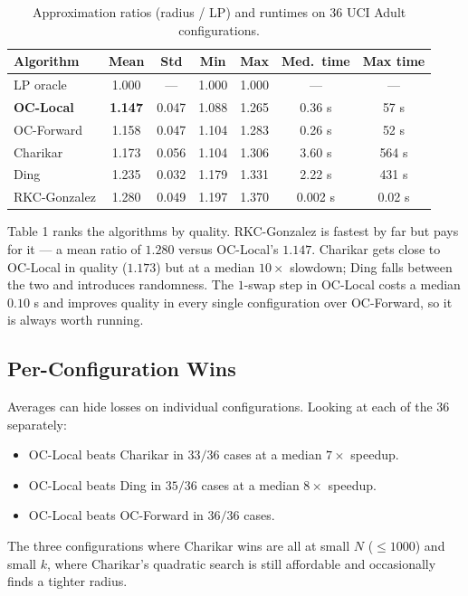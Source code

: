 \documentclass[11pt]{article}
\begin{document}
\begin{table}[H]
\centering
\begin{tabular}{lcccccc}
\toprule
Algorithm & Mean & Std & Min & Max & Med.\ time & Max time \\
\midrule
LP oracle     & 1.000 & ---   & 1.000 & 1.000 & --- & --- \\
\textbf{OC-Local}  & \textbf{1.147} & 0.047 & 1.088 & 1.265 & 0.36 s & 57 s \\
OC-Forward    & 1.158 & 0.047 & 1.104 & 1.283 & 0.26 s & 52 s \\
Charikar      & 1.173 & 0.056 & 1.104 & 1.306 & 3.60 s & 564 s \\
Ding          & 1.235 & 0.032 & 1.179 & 1.331 & 2.22 s & 431 s \\
RKC-Gonzalez  & 1.280 & 0.049 & 1.197 & 1.370 & 0.002 s & 0.02 s \\
\bottomrule
\end{tabular}
\caption{Approximation ratios (radius / LP) and runtimes on 36 UCI Adult configurations.}
\end{table}

Table 1 ranks the algorithms by quality. RKC-Gonzalez is fastest by far but pays for it --- a mean ratio of $1.280$ versus OC-Local's $1.147$. Charikar gets close to OC-Local in quality ($1.173$) but at a median $10\times$ slowdown; Ding falls between the two and introduces randomness. The $1$-swap step in OC-Local costs a median $0.10$ s and improves quality in every single configuration over OC-Forward, so it is always worth running.

\subsection{Per-Configuration Wins}

Averages can hide losses on individual configurations. Looking at each of the 36 separately:
\begin{itemize}
    \item OC-Local beats Charikar in $33/36$ cases at a median $7\times$ speedup.
    \item OC-Local beats Ding in $35/36$ cases at a median $8\times$ speedup.
    \item OC-Local beats OC-Forward in $36/36$ cases.
\end{itemize}

The three configurations where Charikar wins are all at small $N$ ($\le 1000$) and small $k$, where Charikar's quadratic search is still affordable and occasionally finds a tighter radius.
\end{document}
